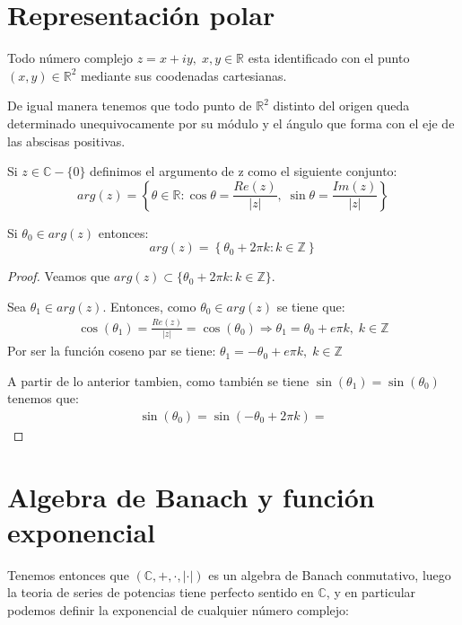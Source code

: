 \section{Representación polar}
Todo número complejo \(z=x+iy, \; x,y \in \mathbb{R}\) esta identificado con el punto \((x,y)\in \mathbb{R}^{2}\) mediante sus coodenadas cartesianas.

De igual manera tenemos que todo punto de \(\mathbb{R}^{2}\) distinto del origen queda determinado unequivocamente por su módulo y el ángulo que forma con el eje de las abscisas positivas.


\begin{definicion}[Argumento]

  Si \(z \in \mathbb{C}-\{0\}\) definimos el argumento de z como el siguiente conjunto:
  \[arg(z) = \left\{ \theta \in \mathbb{R} : \cos{\theta}=\frac{Re(z)}{|z|}, \; \sin{\theta}=\frac{Im(z)}{|z|}\right\}\]
\end{definicion}

\begin{proposicion}
 Si \(\theta_0 \in arg(z)\) entonces:
 \[arg(z)= \left\{ \theta_0+2\pi k : k \in \mathbb{Z} \right\}\]
\end{proposicion}
\begin{proof}
  Veamos que \(arg(z)\subset \{\theta_0 +2 \pi k : k \in \mathbb{Z}\}\).

  Sea \(\theta_1 \in arg(z)\). Entonces, como \(\theta_0 \in arg(z)\) se tiene que:
  \begin{eqnarray*}
    \cos(\theta_1) = \frac{Re(z)}{|z|} = \cos(\theta_0) \Rightarrow \theta_1 = \theta_0 + e \pi k, \; k \in \mathbb{Z}
  \end{eqnarray*}
  Por ser la función coseno par se tiene: \(\theta_1 = -\theta_0 + e \pi k, \; k \in \mathbb{Z}\)

  A partir de lo anterior tambien, como también se tiene \( \sin(\theta_1) = \sin(\theta_0)\) tenemos que:
  \begin{eqnarray*}
    \sin(\theta_0) = \sin(-\theta_0+2\pi k ) = 
  \end{eqnarray*}
\end{proof}

\section{Algebra de Banach y función exponencial}
Tenemos entonces que \((\mathbb{C},+,\cdot, |\cdot|)\) es un algebra de Banach conmutativo, luego la teoria de series de potencias tiene perfecto sentido en \(\mathbb{C}\), y en particular podemos definir la exponencial de cualquier número complejo:

